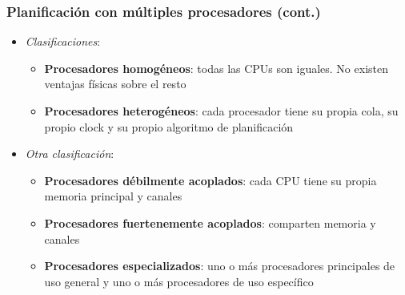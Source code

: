 \begin{frame}
  \frametitle{Planificación con múltiples procesadores (cont.)}
	\begin{itemize}		
		\item \emph{Clasificaciones}:
		\begin{itemize}
			\item \textbf{Procesadores homogéneos}: todas las CPUs son iguales. No existen ventajas físicas sobre el resto
			\item \textbf{Procesadores heterogéneos}: cada procesador tiene su propia cola, su propio clock y su propio algoritmo de planificación
		\end{itemize}
		\item \emph{Otra clasificación}:
		\begin{itemize}
			\item \textbf{Procesadores débilmente acoplados}: cada CPU tiene su propia memoria principal y canales
			\item \textbf{Procesadores fuertenemente acoplados}: comparten memoria y canales
			\item \textbf{Procesadores especializados}: uno o más procesadores principales de uso general y uno o más procesadores de uso específico
		\end{itemize}		
	\end{itemize}
\end{frame}